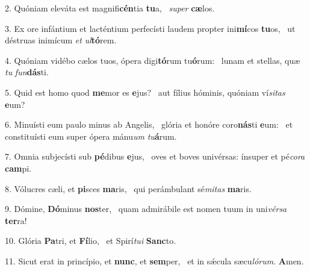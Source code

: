 2. Quóniam eleváta est magnifi\textbf{cén}tia \textbf{tu}a, \ast\  \textit{su}\textit{per} \textbf{cæ}los.\

3. Ex ore infántium et lacténtium perfecísti laudem propter ini\textbf{mí}cos \textbf{tu}os, \ast\  ut déstruas inimícum \textit{et} \textit{ul}\textbf{tó}rem.\

4. Quóniam vidébo cælos tuos, ópera digi\textbf{tó}rum tu\textbf{ó}rum: \ast\  lunam et stellas, quæ \textit{tu} \textit{fun}\textbf{dás}ti.\

5. Quid est homo quod \textbf{me}mor es \textbf{e}jus? \ast\  aut fílius hóminis, quóniam ví\textit{si}\textit{tas} \textbf{e}um?\

6. Minuísti eum paulo minus ab Angelis, \dag\  glória et honóre coro\textbf{nás}ti \textbf{e}um: \ast\  et constituísti eum super ópera mánu\textit{um} \textit{tu}\textbf{á}rum.\

7. Omnia subjecísti sub \textbf{pé}dibus \textbf{e}jus, \ast\  oves et boves univérsas: ínsuper et pé\textit{co}\textit{ra} \textbf{cam}pi.\

8. Vólucres cæli, et \textbf{pi}sces \textbf{ma}ris, \ast\  qui perámbulant sé\textit{mi}\textit{tas} \textbf{ma}ris.\

9. Dómine, \textbf{Dó}minus \textbf{nos}ter, \ast\  quam admirábile est nomen tuum in uni\textit{vér}\textit{sa} \textbf{ter}ra!\

10. Glória \textbf{Pa}tri, et \textbf{Fí}lio, \ast\  et Spirí\textit{tu}\textit{i} \textbf{Sanc}to.\

11. Sicut erat in princípio, et \textbf{nunc}, et \textbf{sem}per, \ast\  et in sǽcula sæcu\textit{ló}\textit{rum}. \textbf{A}men.\

